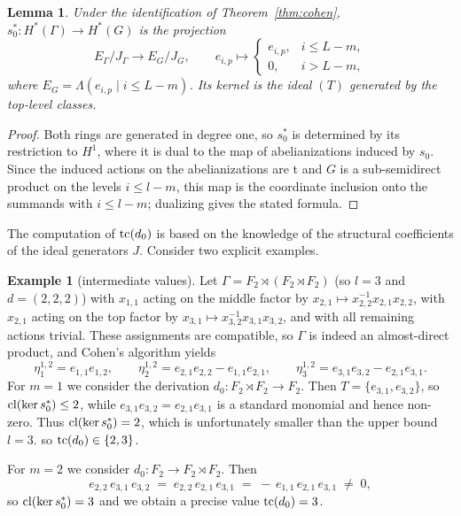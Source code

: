 \documentclass[11pt]{amsart}
\theoremstyle{plain}
\newtheorem{lemma}[theorem]{Lemma}
\theoremstyle{definition}
\newtheorem{example}[theorem]{Example}
\newcommand{\HH}{H^{*}}
\newcommand{\cl}{\mathop{\rm cl}\nolimits}
\newcommand{\tc}{\mathop{\rm tc}\nolimits}
\newcommand{\rt}{\rtimes}
\begin{document}
\begin{lemma}\label{lem:kernel}
Under the identification of Theorem~\ref{thm:cohen}, $s_0^{*}\colon\HH(\Gamma)\to\HH(G)$
is the projection
$$  E_\Gamma/J_\Gamma\longrightarrow E_G/J_G,   \qquad
  e_{i,p}\longmapsto 
  \begin{cases}
    e_{i,p}, & i\le L-m,\\[2pt]
    0, & i>L-m,
  \end{cases}
$$
where $E_G=\Lambda(e_{i,p}\mid i\le L-m)$. Its kernel is the ideal $(T)$ generated by
the top-level classes.
\end{lemma}
\begin{proof}
Both rings are generated in degree one, so $s_0^*$ is determined by its restriction to
$H^1$, where it is dual to the map of abelianizations induced by $s_0$. Since the induced
actions on the abelianizations are t and $G$ is a
sub-semidirect product on the levels $i\le l-m$, this map is the coordinate
inclusion onto the summands with $i\le l-m$; dualizing gives the stated formula.
\end{proof}

The computation of $\tc(d_0)$ is based on the knowledge of the structural coefficients 
of the ideal generators $J$. Consider two explicit examples. 
 
\begin{example}[intermediate values]
Let $\Gamma=F_2\rt(F_2\rt F_2)$ (so $l=3$ and $d=(2,2,2)$) with $x_{1,1}$ acting on the
middle factor by $x_{2,1}\mapsto x_{2,2}^{-1}x_{2,1}x_{2,2}$, with $x_{2,1}$ acting on the
top factor by $x_{3,1}\mapsto x_{3,2}^{-1}x_{3,1}x_{3,2}$, and with all remaining actions
trivial. These assignments are compatible, so $\Gamma$ is indeed an almost-direct
product, and Cohen's algorithm yields
$$ \eta_1^{1,2}=e_{1,1}e_{1,2},  \qquad  \eta_2^{1,2}=e_{2,1}e_{2,2}-e_{1,1}e_{2,1},
  \qquad   \eta_3^{1,2}=e_{3,1}e_{3,2}-e_{2,1}e_{3,1}.$$
For $m=1$ we consider the derivation $d_0\colon F_2\rtimes F_2\to F_2$. Then $T=\{e_{3,1},e_{3,2}\}$, 
so $\cl(\ker s_0^*)\le2$, 
while $e_{3,1}e_{3,2}=e_{2,1}e_{3,1}$ is a standard monomial and hence non-zero. Thus
$\cl(\ker s_0^*)=2$, which is unfortunately smaller than the upper bound $l=3$. 
so $\tc(d_0)\in\{2,3\}$.

For $m=2$ we consider $d_0\colon F_2\to F_2\rtimes F_2$. Then 
$$  e_{2,2}\,e_{3,1}\,e_{3,2}   \;=\;e_{2,2}\,e_{2,1}\,e_{3,1}
  \;=\;-\,e_{1,1}\,e_{2,1}\,e_{3,1}\;\neq\;0 ,$$
so $\cl(\ker s_0^*)=3$ and we obtain a precise value $\tc(d_0)=3$.
\end{example}
 
\end{document}
